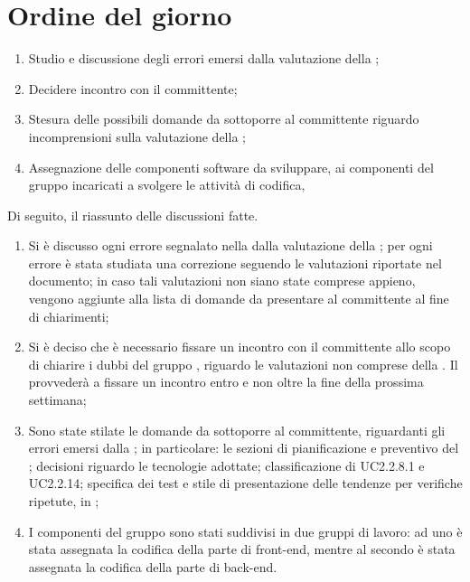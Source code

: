 \documentclass[../AnalisiDeiRequisiti.tex]{subfiles}
\begin{document}
	\section*{Ordine del giorno}
		\begin{enumerate}
			\item Studio e discussione degli errori emersi dalla valutazione della \revisionediprogettazione;
			\item Decidere incontro con il committente;
			\item Stesura delle possibili domande da sottoporre al committente riguardo incomprensioni sulla valutazione della \revisionediprogettazione;
			\item Assegnazione delle componenti software da sviluppare, ai componenti del gruppo incaricati a svolgere le attività di codifica, 
		\end{enumerate}
		Di seguito, il riassunto delle discussioni fatte.
		\begin{enumerate}
		\item Si è discusso ogni errore segnalato nella dalla valutazione della \revisionediprogettazione; per ogni errore è stata studiata una correzione seguendo le valutazioni riportate nel documento; in caso tali valutazioni non siano state comprese appieno, vengono aggiunte alla lista di domande da presentare al committente al fine di chiarimenti;
		\item Si è deciso che è necessario fissare un incontro con il committente allo scopo di chiarire i dubbi del gruppo \kaleidoscode, riguardo le valutazioni non comprese della \revisionediprogettazione. Il \responsabilediprogetto provvederà a fissare un incontro entro e non oltre la fine della prossima settimana;
		\item Sono state stilate le domande da sottoporre al committente, riguardanti gli errori emersi dalla \revisionediprogettazione; in particolare: le sezioni di pianificazione e preventivo del \pianodiprogetto; decisioni riguardo le tecnologie adottate; classificazione di UC2.2.8.1 e UC2.2.14; specifica dei test e stile di presentazione delle tendenze per verifiche ripetute, in \pianodiqualifica;
		\item I componenti del gruppo sono stati suddivisi in due gruppi di lavoro: ad uno è stata assegnata la codifica della parte di front-end, mentre al secondo è stata assegnata la codifica della parte di back-end. 
		
		\end{enumerate}
\end{document}
